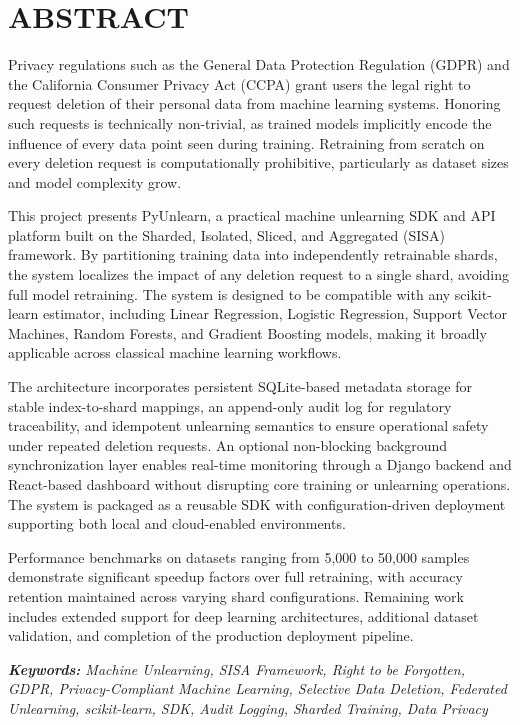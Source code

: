 \chapter*{\textbf{ABSTRACT}}

\noindent
Privacy regulations such as the General Data Protection Regulation (GDPR) and the California Consumer Privacy Act (CCPA) grant users the legal right to request deletion of their personal data from machine learning systems. Honoring such requests is technically non-trivial, as trained models implicitly encode the influence of every data point seen during training. Retraining from scratch on every deletion request is computationally prohibitive, particularly as dataset sizes and model complexity grow.

\noindent
This project presents PyUnlearn, a practical machine unlearning SDK and API platform built on the Sharded, Isolated, Sliced, and Aggregated (SISA) framework. By partitioning training data into independently retrainable shards, the system localizes the impact of any deletion request to a single shard, avoiding full model retraining. The system is designed to be compatible with any scikit-learn estimator, including Linear Regression, Logistic Regression, Support Vector Machines, Random Forests, and Gradient Boosting models, making it broadly applicable across classical machine learning workflows.

\noindent
The architecture incorporates persistent SQLite-based metadata storage for stable index-to-shard mappings, an append-only audit log for regulatory traceability, and idempotent unlearning semantics to ensure operational safety under repeated deletion requests. An optional non-blocking background synchronization layer enables real-time monitoring through a Django backend and React-based dashboard without disrupting core training or unlearning operations. The system is packaged as a reusable SDK with configuration-driven deployment supporting both local and cloud-enabled environments.

\noindent
Performance benchmarks on datasets ranging from 5,000 to 50,000 samples demonstrate significant speedup factors over full retraining, with accuracy retention maintained across varying shard configurations. Remaining work includes extended support for deep learning architectures, additional dataset validation, and completion of the production deployment pipeline.

\vspace{0.8cm}
\noindent\textit{\textbf{Keywords:} Machine Unlearning, SISA Framework, Right to be Forgotten, GDPR, Privacy-Compliant Machine Learning, Selective Data Deletion, Federated Unlearning, scikit-learn, SDK, Audit Logging, Sharded Training, Data Privacy}
